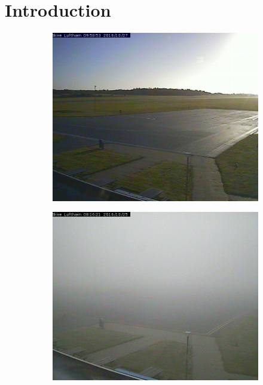 \documentclass[
    ,title     = {{Methods for image classification}}
    ,longtitle
    ,highlight = dtured
    ,toplogo   = {{template/tex_dtu_compute_b_uk}}
    ,botlogo   = {{template/tex_dtu_frise}}
    ,papersize = {{a0paper}}
    ,colcount  = {{3columns}}
]{dtuposter}
\begin{document}
\begin{dtuposterhead} %
\end{dtuposterhead}
%
%
\begin{minipage}{\textwidth}
\section*{Introduction}

\begin{figure}
\centering
\vspace{-12cm}
\begin{subfigure}[t]{0.15\textwidth}
\includegraphics[width=\textwidth]{clear_example}
\end{subfigure}
\begin{subfigure}[t]{0.15\textwidth}
\includegraphics[width=\textwidth]{foggy_example}

\end{subfigure}
\end{figure}
\end{minipage}
\end{document}
